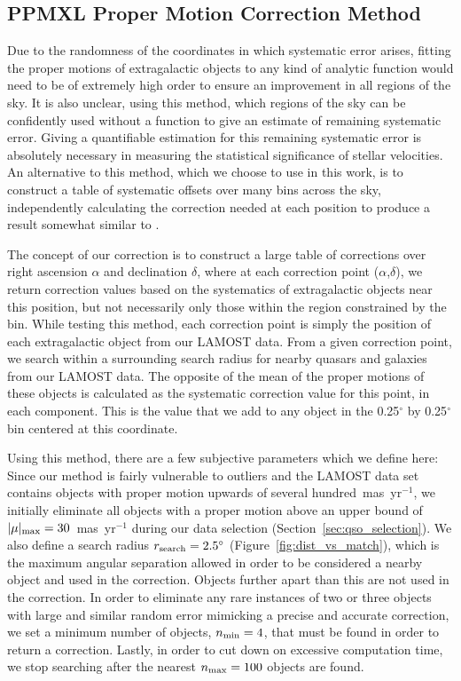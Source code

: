 \documentclass[11pt,preprint]{aastex6}
\begin{document}
\subsection{PPMXL Proper Motion Correction Method} \label{sec:method}

Due to the randomness of the coordinates in which systematic error arises, fitting the proper motions of extragalactic objects to any kind of analytic function would need to be of extremely high order to ensure an improvement in all regions of the sky.
It is also unclear, using this method, which regions of the sky can be confidently used without a function to give an estimate of remaining systematic error.
Giving a quantifiable estimation for this remaining systematic error is absolutely necessary in measuring the statistical significance of stellar velocities.
An alternative to this method, which we choose to use in this work, is to construct a table of systematic offsets over many bins across the sky, independently calculating the correction needed at each position to produce a result somewhat similar to \citet{Grabowski2015}.

The concept of our correction is to construct a large table of corrections over right ascension $\alpha$ and declination $\delta$, where at each correction point ($\alpha$,$\delta$), we return correction values based on the systematics of extragalactic objects near this position, but not necessarily only those within the region constrained by the bin.
While testing this method, each correction point is simply the position of each extragalactic object from our LAMOST data.
From a given correction point, we search within a surrounding search radius for nearby quasars and galaxies from our LAMOST data.
The opposite of the mean of the proper motions of these objects is calculated as the
systematic correction value for this point, in each component. This is the value that we add to any object in the 0.25$^{\circ}$ by 0.25$^{\circ}$ bin centered at this coordinate.

Using this method, there are a few subjective parameters which we define here:
Since our method is fairly vulnerable to outliers and the LAMOST data set contains objects with proper motion upwards of several hundred~mas~yr$^{-1}$, we initially eliminate all objects with a proper motion above an upper bound of $|\mu|_{\rm max} = 30$~mas~yr$^{-1}$ during our data selection (Section~\ref{sec:qso_selection}).
We also define a search radius $r_{\rm search} = 2.5^{\circ}$ (Figure~\ref{fig:dist_vs_match}), which is the maximum angular separation allowed in order to be considered a nearby object and used in the correction.
Objects further apart than this are not used in the correction.
In order to eliminate any rare instances of two or three objects with large and similar random error mimicking a precise and accurate correction, we set a minimum number of objects, $n_{\rm min} = 4$, that must be found in order to return a correction.
Lastly, in order to cut down on excessive computation time, we stop searching after the nearest $n_{\rm max} = 100$ objects are found.
\end{document}
